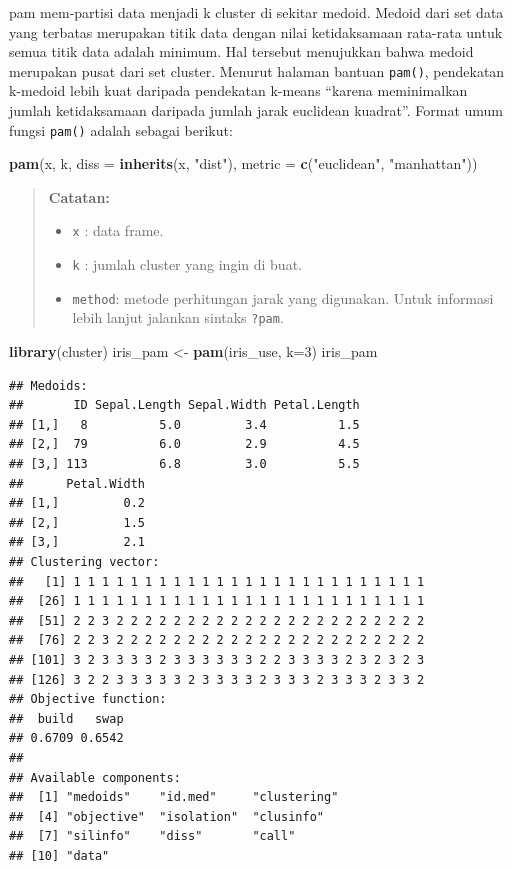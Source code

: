 \documentclass[]{book}
\newenvironment{Shaded}{\begin{snugshade}}{\end{snugshade}}
\newcommand{\DataTypeTok}[1]{\textcolor[rgb]{0.13,0.29,0.53}{#1}}
\newcommand{\DecValTok}[1]{\textcolor[rgb]{0.00,0.00,0.81}{#1}}
\newcommand{\KeywordTok}[1]{\textcolor[rgb]{0.13,0.29,0.53}{\textbf{#1}}}
\newcommand{\NormalTok}[1]{#1}
\newcommand{\StringTok}[1]{\textcolor[rgb]{0.31,0.60,0.02}{#1}}
\providecommand{\tightlist}{%
  \setlength{\itemsep}{0pt}\setlength{\parskip}{0pt}}
\theoremstyle{definition}
\theoremstyle{definition}
\theoremstyle{definition}
\theoremstyle{remark}
\begin{document}
pam mem-partisi data menjadi k cluster di sekitar medoid. Medoid dari set data yang terbatas merupakan titik data dengan nilai ketidaksamaan rata-rata untuk semua titik data adalah minimum. Hal tersebut menujukkan bahwa medoid merupakan pusat dari set cluster. Menurut halaman bantuan \texttt{pam()}, pendekatan k-medoid lebih kuat daripada pendekatan k-means ``karena meminimalkan jumlah ketidaksamaan daripada jumlah jarak euclidean kuadrat''. Format umum fungsi \texttt{pam()} adalah sebagai berikut:

\begin{Shaded}
\begin{Highlighting}[]
\KeywordTok{pam}\NormalTok{(x, k, }\DataTypeTok{diss =} \KeywordTok{inherits}\NormalTok{(x, }\StringTok{"dist"}\NormalTok{),}
    \DataTypeTok{metric =} \KeywordTok{c}\NormalTok{(}\StringTok{"euclidean"}\NormalTok{, }\StringTok{"manhattan"}\NormalTok{))}
\end{Highlighting}
\end{Shaded}

\begin{quote}
\textbf{Catatan:}

\begin{itemize}
\tightlist
\item
  \texttt{x} : data frame.
\item
  \texttt{k} : jumlah cluster yang ingin di buat.
\item
  \texttt{method}: metode perhitungan jarak yang digunakan. Untuk informasi lebih lanjut jalankan sintaks \texttt{?pam}.
\end{itemize}
\end{quote}

\begin{Shaded}
\begin{Highlighting}[]
\KeywordTok{library}\NormalTok{(cluster)}
\NormalTok{iris_pam <-}\StringTok{ }\KeywordTok{pam}\NormalTok{(iris_use, }\DataTypeTok{k=}\DecValTok{3}\NormalTok{)}
\NormalTok{iris_pam}
\end{Highlighting}
\end{Shaded}

\begin{verbatim}
## Medoids:
##       ID Sepal.Length Sepal.Width Petal.Length
## [1,]   8          5.0         3.4          1.5
## [2,]  79          6.0         2.9          4.5
## [3,] 113          6.8         3.0          5.5
##      Petal.Width
## [1,]         0.2
## [2,]         1.5
## [3,]         2.1
## Clustering vector:
##   [1] 1 1 1 1 1 1 1 1 1 1 1 1 1 1 1 1 1 1 1 1 1 1 1 1 1
##  [26] 1 1 1 1 1 1 1 1 1 1 1 1 1 1 1 1 1 1 1 1 1 1 1 1 1
##  [51] 2 2 3 2 2 2 2 2 2 2 2 2 2 2 2 2 2 2 2 2 2 2 2 2 2
##  [76] 2 2 3 2 2 2 2 2 2 2 2 2 2 2 2 2 2 2 2 2 2 2 2 2 2
## [101] 3 2 3 3 3 3 2 3 3 3 3 3 3 2 2 3 3 3 3 2 3 2 3 2 3
## [126] 3 2 2 3 3 3 3 3 2 3 3 3 3 2 3 3 3 2 3 3 3 2 3 3 2
## Objective function:
##  build   swap 
## 0.6709 0.6542 
## 
## Available components:
##  [1] "medoids"    "id.med"     "clustering"
##  [4] "objective"  "isolation"  "clusinfo"  
##  [7] "silinfo"    "diss"       "call"      
## [10] "data"
\end{verbatim}
\end{document}
